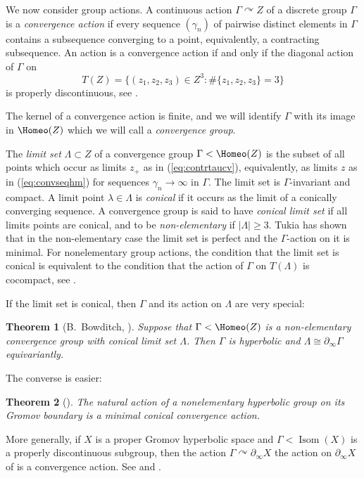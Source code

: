 \documentclass[12pt]{amsbook}%
\newtheorem{thm}{Theorem}[chapter]
\theoremstyle{definition}
\theoremstyle{remark}
\numberwithin{section}{chapter}
\numberwithin{subsection}{section}
\numberwithin{figure}{chapter}
\DeclareMathOperator{\Isom}{Isom}
\DeclareMathOperator{\acts}{\curvearrowright}
\def\Ga{\Gamma}
\def\ga{\gamma}
\def\La{\Lambda}
\def\la{\lambda}
\def\geo{\partial_\infty}
\begin{document}
\medskip
We now consider group actions. 
A continuous action $\Ga\acts Z$ of a 
discrete group $\Ga$ is a {\em convergence action} 
if every sequence $(\ga_n)$ of pairwise distinct elements in $\Ga$ 
contains a subsequence converging to a point, equivalently,
a contracting subsequence. An action is a convergence action if and only if the diagonal action of $\Ga$ on
$$
T(Z)=\{(z_1, z_2, z_3)\in Z^3: \#\{z_1, z_2, z_3\}= 3\}
$$
is properly discontinuous, see \cite{Bowditch}. 

The kernel of a convergence action is finite,
and we will identify $\Ga$ with its image in $\Homeo(Z)$
which we will call a {\em convergence group}. 

The {\em limit set} $\La\subset Z$ of a convergence group $\Ga<\Homeo(Z)$ is the subset of all points 
which occur as limits $z_+$ as in (\ref{eq:contrtaucv}),
equivalently,
as limits $z$ as in (\ref{eq:convseqhm})
for sequences $\ga_n\to\infty$ in $\Ga$.
The limit set is $\Ga$-invariant and compact.
A limit point $\la\in\La$ is {\em conical} if it occurs as the limit of a conically converging sequence.
A convergence group is said to have {\em conical limit set} if all limits points are conical,
and to be {\em non-elementary} if $|\La|\geq 3$.
Tukia \cite[Thm.\ 2S]{Tukia} has shown that in the non-ele\-men\-ta\-ry case the limit set is perfect 
and the $\Ga$-action on it is minimal. For nonelementary group actions, the condition that the limit set is conical is equivalent to  the condition that the action of $\Ga$ on $T(\La)$ is cocompact, see \cite{Bowditch}. 

If the limit set is conical, then $\Ga$ and its action on $\La$ are very special:

\begin{thm}[B.~Bowditch, {\cite{Bowditch}}]
\label{thm:bowdchr}
Suppose that $\Ga<\Homeo(Z)$ is a non-elementary convergence group with conical limit set $\La$.
Then $\Ga$ is hyperbolic and $\La\cong\geo\Ga$ equivariantly.
\end{thm}

The converse is easier:

\begin{thm}[{\cite{Gromov,Tukia,Freden}}]
\label{thm:hypgpbdac}
The natural action of a nonelementary hyperbolic group on its Gromov boundary 
is a minimal conical convergence action.
\end{thm} 

More generally, if $X$ is a proper Gromov hyperbo\-lic space and $\Ga< \Isom(X)$ is 
a properly discontinuous subgroup, then the action $\Ga\acts \geo X$  
the action on $\geo X$ of is a convergence action. See \cite[Theorem 3A]{Tukia} and \cite{DK18}. 
\end{document}
